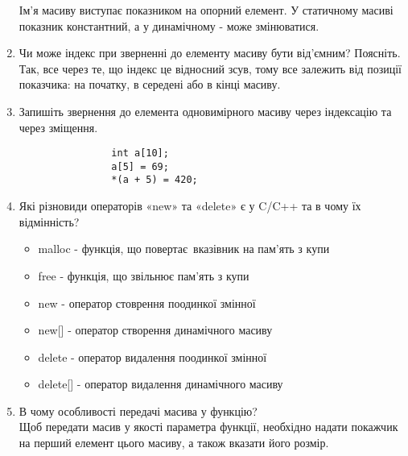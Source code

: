 \begin{enumerate}
          Ім’я масиву виступає показником на опорний елемент.
          У статичному масиві показник константний,
          а у динамічному - може змінюватися.
    \item Чи може індекс при зверненні до елементу масиву бути від'ємним? Поясніть. \\
          Так, все через те, що індекс це відносний зсув, тому все залежить від позиції
          показчика: на початку, в середені або в кінці масиву.
    \item Запишіть звернення до елемента одновимірного масиву через індексацію та через зміщення.
          \begin{verbatim}
                int a[10];
                a[5] = 69;
                *(a + 5) = 420;
            \end{verbatim}
    \item Які різновиди операторів «new» та «delete» є у C/C++ та в чому їх відмінність?
          \begin{itemize}
              \item malloc - функція, що повертає вказівник на пам'ять з купи
              \item free - функція, що звільнює пам'ять з купи
              \item new - оператор стоврення поодинкої змінної
              \item new[] - оператор створення динамічного масиву
              \item delete - оператор видалення поодинкої змінної
              \item  delete[] - оператор видалення динамічного масиву
          \end{itemize}
    \item В чому особливості передачі масива у функцію? \\
          Щоб передати масив у якості параметра функції,
          необхідно надати покажчик на перший елемент цього масиву,
          а також вказати його розмір.
\end{enumerate}
